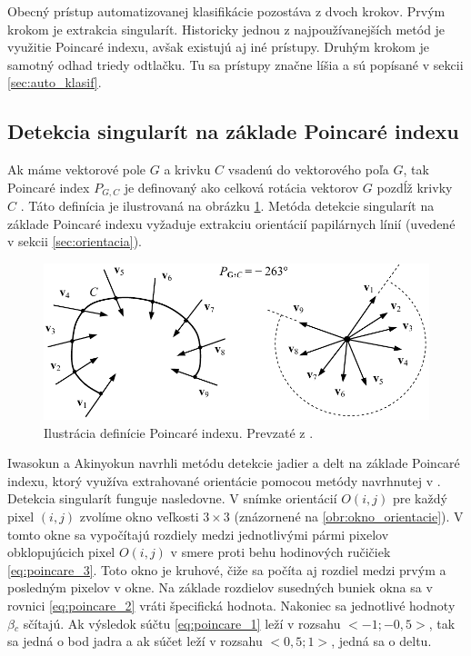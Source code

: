   Obecný prístup automatizovanej klasifikácie pozostáva z dvoch krokov. Prvým krokom je extrakcia singularít. Historicky jednou z najpoužívanejších metód
  je využitie Poincaré indexu, avšak existujú aj iné prístupy. Druhým krokom je samotný odhad triedy odtlačku. Tu sa prístupy značne líšia a sú popísané
  v sekcii \ref{sec:auto_klasif}.

  \subsection{Detekcia singularít na základe Poincaré indexu}
  Ak máme vektorové pole $G$ a krivku $C$ vsadenú do vektorového poľa $G$, tak Poincaré index $P_{G,C}$ je definovaný ako celková rotácia vektorov $G$ pozdĺž
  krivky $C$ \cite{Handbook}. Táto definícia je ilustrovaná na obrázku \ref{obr:poincare_index}. Metóda detekcie singularít na základe Poincaré indexu vyžaduje
  extrakciu orientácií papilárnych línií (uvedené v sekcii \ref{sec:orientacia}).

  \begin{figure}[h]
    \centering
    \includegraphics[width=0.5\linewidth]{obrazky-figures/poincare_index.png}
    \caption{Ilustrácia definície Poincaré indexu. Prevzaté z \cite{Handbook}.}
    \label{obr:poincare_index}
  \end{figure}

  Iwasokun a Akinyokun \cite{iwasokun2014singularities} navrhli metódu detekcie jadier a delt na základe Poincaré indexu, ktorý využíva extrahované orientácie
  pomocou metódy navrhnutej v \cite{Hong}. Detekcia singularít funguje nasledovne. V snímke orientácií $O(i,j)$ pre každý pixel $(i,j)$ zvolíme
  okno veľkosti $3\times{}3$ (znázornené na \ref{obr:okno_orientacie}). V tomto okne sa vypočítajú rozdiely medzi jednotlivými pármi pixelov
  obklopujúcich pixel $O(i,j)$ v smere proti behu hodinových ručičiek \ref{eq:poincare_3}. Toto okno je kruhové, čiže sa počíta aj rozdiel medzi prvým
  a posledným pixelov v okne. Na základe rozdielov susedných buniek okna sa v rovnici \ref{eq:poincare_2} vráti špecifická hodnota. Nakoniec sa jednotlivé
  hodnoty $\beta{}_c$ sčítajú. Ak výsledok súčtu \ref{eq:poincare_1} leží v rozsahu $<-1;-0,5>$, tak sa jedná o bod jadra a ak súčet leží v rozsahu $<0,5;1>$,
  jedná sa o deltu.

